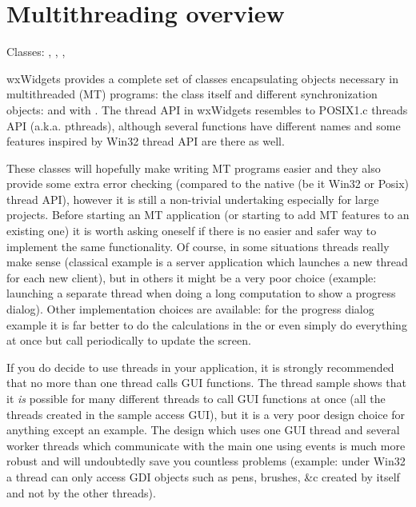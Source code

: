 \section{Multithreading overview}\label{wxthreadoverview}

Classes: , , 
, 

wxWidgets provides a complete set of classes encapsulating objects necessary in
multithreaded (MT) programs: the  class itself and different
synchronization objects:  and 
 with 
. The thread API in wxWidgets resembles to
POSIX1.c threads API (a.k.a. pthreads), although several functions have
different names and some features inspired by Win32 thread API are there as
well.

These classes will hopefully make writing MT programs easier and they also
provide some extra error checking (compared to the native (be it Win32 or Posix)
thread API), however it is still a non-trivial undertaking especially for large
projects. Before starting an MT application (or starting to add MT features to
an existing one) it is worth asking oneself if there is no easier and safer way
to implement the same functionality. Of course, in some situations threads
really make sense (classical example is a server application which launches a
new thread for each new client), but in others it might be a very poor choice
(example: launching a separate thread when doing a long computation to show a
progress dialog). Other implementation choices are available: for the progress
dialog example it is far better to do the calculations in the 
 or even simply do everything at once
but call  periodically to update
the screen.

If you do decide to use threads in your application, it is strongly recommended
that no more than one thread calls GUI functions. The thread sample shows that
it {\it is} possible for many different threads to call GUI functions at once
(all the threads created in the sample access GUI), but it is a very poor design
choice for anything except an example. The design which uses one GUI thread and
several worker threads which communicate with the main one using events is much
more robust and will undoubtedly save you countless problems (example: under
Win32 a thread can only access GDI objects such as pens, brushes, \&c created by
itself and not by the other threads).

